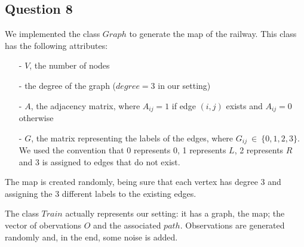 \documentclass[]{article}
\begin{document}
\subsection*{Question 8}
We implemented the class $Graph$ to generate the map of the railway. This class has the following attributes:
\begin{enumerate}
	\item[-] $V$, the number of nodes 
	\item[-] the degree of the graph ($degree=3$ in our setting) 
	\item[-] $A$, the adjacency matrix, where $A_{ij}=1$ if edge $(i,j)$ exists and $A_{ij}=0$ otherwise
	\item[-] $G$, the matrix representing the labels of the edges, where $G_{ij} \ \in \ \{ 0,1,2,3\} $. We used the convention that 0 represents 0, 1 represents $L$, 2 represents $R$ and 3 is assigned to edges that do not exist.
\end{enumerate} 
The map is created randomly, being sure that each vertex has degree 3 and assigning the 3 different labels to the existing edges.

The class $Train$ actually represents our setting: it has a graph, the map; the vector of obervations $O$ and the associated $path$. Observations are generated randomly and, in the end, some noise is added.
\end{document}
